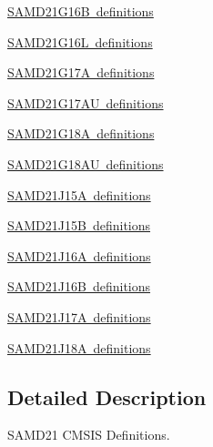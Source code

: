 \begin{DoxyCompactItemize}
\item 
\mbox{\hyperlink{group___s_a_m_d21_g16_b__definitions}{S\+A\+M\+D21\+G16\+B definitions}}
\item 
\mbox{\hyperlink{group___s_a_m_d21_g16_l__definitions}{S\+A\+M\+D21\+G16\+L definitions}}
\item 
\mbox{\hyperlink{group___s_a_m_d21_g17_a__definitions}{S\+A\+M\+D21\+G17\+A definitions}}
\item 
\mbox{\hyperlink{group___s_a_m_d21_g17_a_u__definitions}{S\+A\+M\+D21\+G17\+A\+U definitions}}
\item 
\mbox{\hyperlink{group___s_a_m_d21_g18_a__definitions}{S\+A\+M\+D21\+G18\+A definitions}}
\item 
\mbox{\hyperlink{group___s_a_m_d21_g18_a_u__definitions}{S\+A\+M\+D21\+G18\+A\+U definitions}}
\item 
\mbox{\hyperlink{group___s_a_m_d21_j15_a__definitions}{S\+A\+M\+D21\+J15\+A definitions}}
\item 
\mbox{\hyperlink{group___s_a_m_d21_j15_b__definitions}{S\+A\+M\+D21\+J15\+B definitions}}
\item 
\mbox{\hyperlink{group___s_a_m_d21_j16_a__definitions}{S\+A\+M\+D21\+J16\+A definitions}}
\item 
\mbox{\hyperlink{group___s_a_m_d21_j16_b__definitions}{S\+A\+M\+D21\+J16\+B definitions}}
\item 
\mbox{\hyperlink{group___s_a_m_d21_j17_a__definitions}{S\+A\+M\+D21\+J17\+A definitions}}
\item 
\mbox{\hyperlink{group___s_a_m_d21_j18_a__definitions}{S\+A\+M\+D21\+J18\+A definitions}}
\end{DoxyCompactItemize}


\subsection{Detailed Description}
S\+A\+M\+D21 C\+M\+S\+IS Definitions. 

